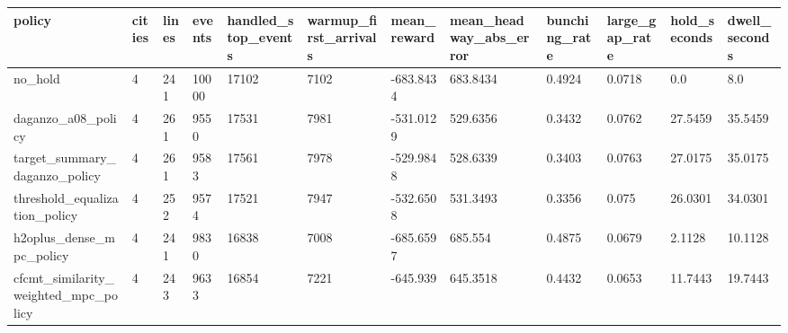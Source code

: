 \begin{tabular}{llllllllllll}
\toprule
policy & cities & lines & events & handled\_stop\_events & warmup\_first\_arrivals & mean\_reward & mean\_headway\_abs\_error & bunching\_rate & large\_gap\_rate & hold\_seconds & dwell\_seconds \\
\midrule
no\_hold & 4 & 241 & 10000 & 17102 & 7102 & -683.8434 & 683.8434 & 0.4924 & 0.0718 & 0.0 & 8.0 \\
daganzo\_a08\_policy & 4 & 261 & 9550 & 17531 & 7981 & -531.0129 & 529.6356 & 0.3432 & 0.0762 & 27.5459 & 35.5459 \\
target\_summary\_daganzo\_policy & 4 & 261 & 9583 & 17561 & 7978 & -529.9848 & 528.6339 & 0.3403 & 0.0763 & 27.0175 & 35.0175 \\
threshold\_equalization\_policy & 4 & 252 & 9574 & 17521 & 7947 & -532.6508 & 531.3493 & 0.3356 & 0.075 & 26.0301 & 34.0301 \\
h2oplus\_dense\_mpc\_policy & 4 & 241 & 9830 & 16838 & 7008 & -685.6597 & 685.554 & 0.4875 & 0.0679 & 2.1128 & 10.1128 \\
cfcmt\_similarity\_weighted\_mpc\_policy & 4 & 243 & 9633 & 16854 & 7221 & -645.939 & 645.3518 & 0.4432 & 0.0653 & 11.7443 & 19.7443 \\
\bottomrule
\end{tabular}
